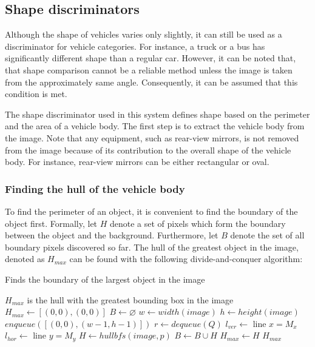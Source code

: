 \documentclass[times, utf8, zavrsni]{fer}
\begin{document}
\subsection{Shape discriminators}
Although the shape of vehicles varies only slightly, it can still be used
as a discriminator for vehicle categories. For instance, a truck or a bus has
significantly different shape than a regular car. However, it can be noted that,
that shape comparison cannot be a reliable method unless the image is taken from
the approximately same angle. Consequently, it can be assumed that this
condition is met.

The shape discriminator used in this system defines shape based on the perimeter
and the area of a vehicle body. The first step is to extract the vehicle body
from the image. Note that any equipment, such as rear-view mirrors, is not
removed from the image because of its contribution to the overall shape of the
vehicle body. For instance, rear-view mirrors can be either rectangular or oval.

\subsubsection{Finding the hull of the vehicle body}

To find the perimeter of an object, it is convenient to find the boundary of the
object first. Formally, let $H$ denote a set of pixels which form the boundary
between the object and the background. Furthermore, let $B$ denote the set of
all boundary pixels discovered so far. The hull of the greatest object in the
image, denoted as $H_{max}$ can be found with the following divide-and-conquer
algorithm:

\begin{algorithm} 
\caption{Finds the boundary of the largest object in the image}
\label{algo:find-largest-hull}
\begin{algorithmic}
\ENSURE $H_{max}$ is the hull with the greatest bounding box in the image
\STATE $H_{max} \gets [(0, 0), (0, 0)]$
\STATE $B \gets \varnothing$
\STATE $w \gets width(image)$
\STATE $h \gets height(image)$
\STATE $enqueue([(0, 0), (w - 1, h - 1)])$
\STATE $r \gets dequeue(Q)$
\STATE $l_{ver} \gets$ line $x = M_x$  
\STATE $l_{hor} \gets$ line $y = M_y$ 
\STATE $H \gets hullbfs(image, p)$
\STATE $B \gets B \cup H$ 
\STATE $H_{max} \gets H$
\ENDIF
\ENDIF
\ENDFOR
{}
\ENDFOR
\ENDIF
\ENDWHILE
\RETURN $H_{max}$
\end{algorithmic}
\end{algorithm}
\end{document}
